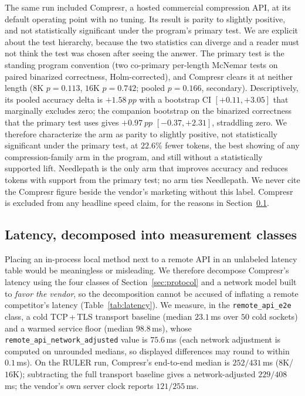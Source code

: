 \documentclass[11pt]{article}
\newcommand{\pp}{~pp}          %
\newcommand{\NP}{Needlepath}
\begin{document}
The same run included Compresr, a hosted commercial compression API, at its default operating point
with no tuning. Its result is parity to slightly positive, and not statistically significant under
the program's primary test. We are explicit about the test hierarchy, because the two statistics
can diverge and a reader must not think the test was chosen after seeing the answer. The primary
test is the standing program convention (two co-primary per-length McNemar tests on paired
binarized correctness, Holm-corrected), and Compresr clears it at neither length ($8$K
$p{=}0.113$, $16$K $p{=}0.742$; pooled $p{=}0.166$, secondary). Descriptively, its pooled accuracy
delta is $+1.58\pp$ with a bootstrap CI $[+0.11,+3.05]$ that marginally excludes zero; the
companion bootstrap on the binarized correctness that the primary test uses gives
$+0.97\pp$ $[-0.37,+2.31]$, straddling zero. We therefore characterize the arm as parity to
slightly positive, not statistically significant under the primary test, at $22.6\%$ fewer
tokens, the best showing of any compression-family arm
in the program, and still without a statistically supported lift. \NP{} is the only arm that
improves accuracy and reduces tokens with support from the primary test; no arm ties \NP{}. We
never cite the Compresr figure beside the vendor's marketing without this label. Compresr is
excluded from any headline speed claim, for the reasons in Section~\ref{sec:latency}.

\subsection{Latency, decomposed into measurement classes}
\label{sec:latency}

Placing an in-process local method next to a remote API in an unlabeled latency table would be
meaningless or misleading. We therefore decompose Compresr's latency using the four classes of
Section~\ref{sec:protocol} and a network model built to \emph{favor the vendor}, so the
decomposition cannot be accused of inflating a remote competitor's latency
(Table~\ref{tab:latency}). We measure, in the \texttt{remote\_api\_e2e} class, a cold TCP\,+\,TLS
transport baseline (median $23.1$\,ms over $50$ cold sockets) and a warmed service floor (median
$98.8$\,ms), whose \texttt{remote\_api\_network\_adjusted} value is $75.6$\,ms (each network
adjustment is computed on unrounded medians, so displayed differences may round to within $0.1$\,ms).
On the RULER run, Compresr's end-to-end median is $252/431$\,ms ($8$K/$16$K); subtracting the full
transport baseline gives a network-adjusted $229/408$\,ms; the vendor's own server clock reports
$121/255$\,ms.
\end{document}
